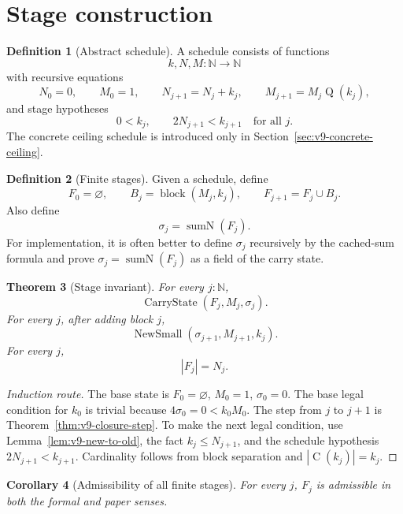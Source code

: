 \documentclass[11pt]{article}
\theoremstyle{definition}
\newtheorem{definition}{Definition}[section]
\theoremstyle{plain}
\newtheorem{theorem}[definition]{Theorem}
\newtheorem{corollary}[definition]{Corollary}
\theoremstyle{remark}
\newcommand{\N}{\mathbb{N}}
\newcommand{\card}[1]{\left|#1\right|}
\newcommand{\SumN}{\operatorname{sumN}}
\newcommand{\Cblock}{\operatorname{C}}
\newcommand{\Qfun}{\operatorname{Q}}
\newcommand{\NewSmall}{\operatorname{NewSmall}}
\newcommand{\CarryState}{\operatorname{CarryState}}
\newcommand{\block}{\operatorname{block}}
\begin{document}
\section{Stage construction}

\begin{definition}[Abstract schedule]\label{def:v9-schedule}
A schedule consists of functions
\[
        k,N,M:\N\to\N
\]
with recursive equations
\[
        N_0=0,
        \qquad M_0=1,
        \qquad N_{j+1}=N_j+k_j,
        \qquad M_{j+1}=M_j\Qfun(k_j),
\]
and stage hypotheses
\[
        0<k_j,
        \qquad
        2N_{j+1}<k_{j+1}\quad\text{for all }j.
\]
The concrete ceiling schedule is introduced only in Section~\ref{sec:v9-concrete-ceiling}.
\end{definition}

\begin{definition}[Finite stages]\label{def:v9-finite-stages}
Given a schedule, define
\[
        F_0=\varnothing,
        \qquad
        B_j=\block(M_j,k_j),
        \qquad
        F_{j+1}=F_j\cup B_j.
\]
Also define
\[
        \sigma_j=\SumN(F_j).
\]
For implementation, it is often better to define \(\sigma_j\) recursively by the cached-sum formula and prove \(\sigma_j=\SumN(F_j)\) as a field of the carry state.
\end{definition}

\begin{theorem}[Stage invariant]\label{thm:v9-stage-invariant}
For every \(j:\N\),
\[
        \CarryState(F_j,M_j,\sigma_j).
\]
For every \(j\), after adding block \(j\),
\[
        \NewSmall(\sigma_{j+1},M_{j+1},k_j).
\]
For every \(j\),
\[
        \card{F_j}=N_j.
\]
\end{theorem}

\begin{proof}[Induction route]
The base state is \(F_0=\varnothing\), \(M_0=1\), \(\sigma_0=0\).  The base legal condition for \(k_0\) is trivial because \(4\sigma_0=0<k_0M_0\).  The step from \(j\) to \(j+1\) is Theorem~\ref{thm:v9-closure-step}.  To make the next legal condition, use Lemma~\ref{lem:v9-new-to-old}, the fact \(k_j\le N_{j+1}\), and the schedule hypothesis \(2N_{j+1}<k_{j+1}\).  Cardinality follows from block separation and \(\card{\Cblock(k_j)}=k_j\).
\end{proof}

\begin{corollary}[Admissibility of all finite stages]\label{cor:v9-finite-stage-adm}
For every \(j\), \(F_j\) is admissible in both the formal and paper senses.
\end{corollary}
\end{document}
